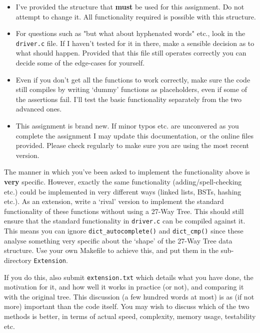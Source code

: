 \begin{exercise}
\begin{itemize}

\item I've provided the structure that {\bf must} be used for this assignment.
Do not attempt to change it. All functionality required is possible with
this structure.

\item For questions such as "but what about hyphenated words" etc., look
in the \verb^driver.c^ file. If I haven't tested for it in there, make a
sensible decision as to what should happen. Provided that this file still
operates correctly you can decide some of the edge-cases for yourself.

\item Even if you don't get all the functions to work correctly, make
sure the code still compiles by writing `dummy' functions as placeholders,
even if some of the assertions fail. I'll test the basic functionality
separately from the two advanced ones.

\item This assignment is brand new. If minor typos
etc. are unconvered as you complete the assignment I
may update this documentation, or the online files
provided. Please check regularly to make sure you
are using the most recent version.

\end{itemize}

\vspace*{1cm}
\vspace*{1ex}

\noindent
The manner in which you've been asked to implement the functionality above is {\bf very}
specific. However, exactly the same functionality (adding/spell-checking etc.)
could be implemented in very different ways (linked lists, BSTs, hashing etc.).
As an extension, write a `rival' version to implement
the standard functionality of these functions without using a 27-Way Tree.
This should still ensure that the standard functionality in \verb^driver.c^
can be compiled against it. This means you
can ignore \verb^dict_autocomplete()^ and \verb^dict_cmp()^ since these
analyse something very
specific about the `shape' of the 27-Way Tree data structure.  Use your own
Makefile to achieve this, and put them in the sub-directory 
\verb^Extension^.

If you do this, also submit \verb^extension.txt^ which details what you
have done, the motivation for it, and how well it works in practice (or
not), and comparing it with the original tree.
This discussion (a few hundred words at most) is as (if not more)
important than the code itself. You may wish to discuss
which of the two methods is better, in terms of actual speed, complexity, memory usage, testability etc.


\end{exercise}
